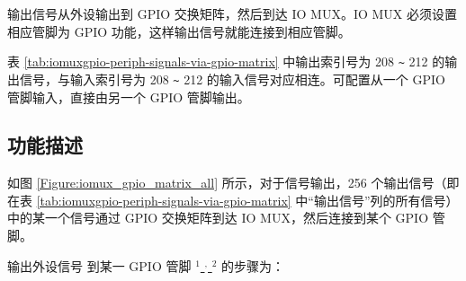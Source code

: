 \documentclass[main\_\_CN.tex]{subfiles}
\begin{document}
输出信号从外设输出到 GPIO 交换矩阵，然后到达 IO MUX。IO MUX 必须设置相应管脚为 GPIO 功能，这样输出信号就能连接到相应管脚。

\begin{tiplisting}
表 \ref{tab:iomuxgpio-periph-signals-via-gpio-matrix} 中输出索引号为 208 \verb+~+ 212 的输出信号，与输入索引号为 208 \verb+~+ 212 的输入信号对应相连。可配置从一个 GPIO 管脚输入，直接由另一个 GPIO 管脚输出。
\end{tiplisting}

\subsection{功能描述}\label{IOMUXPeripheralOutput}

如图 \ref{Figure:iomux_gpio_matrix_all} 所示，对于信号输出，256 个输出信号（即在表 \ref{tab:iomuxgpio-periph-signals-via-gpio-matrix} 中“输出信号”列的所有信号）中的某一个信号通过 GPIO 交换矩阵到达 IO MUX，然后连接到某个 GPIO 管脚。

输出外设信号  到某一 GPIO 管脚 \hyperref[output-note-1]{$^1$ $^,$ $^2$} 的步骤为：
\end{document}
